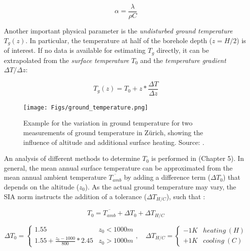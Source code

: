 \begin{equation}
    \alpha = \frac{\lambda}{\rho C}
\end{equation}

Another important physical parameter is the \textit{undisturbed ground temperature} $T_g(z)$. In particular, the temperature at half of the borehole depth ($z = H/2$) is of interest. If no data is available for estimating $T_g$ directly, it can be extrapolated from the \textit{surface temperature} $T_0$ and the \textit{temperature gradient} $\Delta T/\Delta z$: 

\begin{equation}
    T_g(z) = T_0 + z * \frac{\Delta T}{\Delta z}
\end{equation}

\begin{figure}
    \centering
    \texttt{[image: Figs/ground\_temperature.png]}
    \caption[Example for the variation in ground temperature for two measurements of ground temperature in Zürich.]{Example for the variation in ground temperature for two measurements of ground temperature in Zürich, showing the influence of altitude and additional surface heating. Source: \citet{huber_bodentemperaturen_2014}.}
    \label{fig:T_ground}
\end{figure}

An analysis of different methods to determine $T_0$ is performed in \citep{signorelli_geoscientific_2004} (Chapter 5). In general, the mean annual surface temperature can be approximated from the mean annual ambient temperature $\overline{T_{amb}}$ by adding a difference term ($\Delta T_0$) that depends on the altitude ($z_0$). As the actual ground temperature may vary, the SIA norm instructs the addition of a tolerance ($\Delta T_{H/C}$), such that \citep{sia_sondes_2010}: 

\begin{equation}
    T_0 = \overline{T_{amb}} + \Delta T_0 + \Delta T_{H/C} 
\end{equation}

\begin{equation*}
    \Delta T_0 = \left\{
        \begin{matrix}
            1.55 & z_0 < 1000m \\ 1.55 + \frac{z_0 - 1000}{800} * 2.45 & z_0 > 1000m
        \end{matrix} \right. , \quad 
    \Delta T_{H/C}  = \left\{
        \begin{matrix}
            - 1 K & heating\ (H) \\ +1 K & cooling\ (C)
        \end{matrix} \right.    
\end{equation*}

